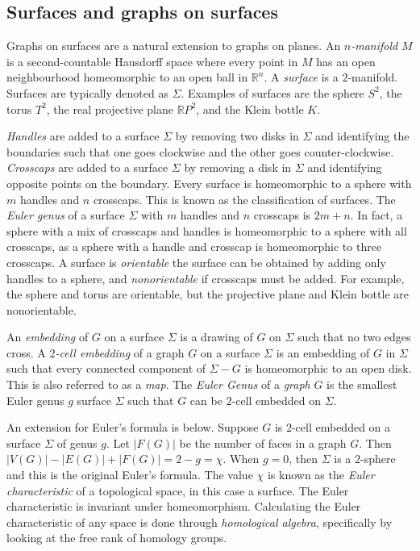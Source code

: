 \subsection{Surfaces and graphs on surfaces}
Graphs on surfaces are a natural extension to graphs on planes.
An \textit{$n$-manifold} $M$ is a second-countable Hausdorff space where every point in $M$ has an open neighbourhood homeomorphic to an open ball in $\mathbb{R}^n$.  
A \textit{surface} is a $2$-manifold. Surfaces are typically denoted as $\Sigma$. Examples of surfaces are the sphere $S^2$, the torus $T^2$, the real projective plane $\mathbb{R}P^2$, and the Klein bottle $K$. 

\textit{Handles} are added to a surface \(\Sigma\) by removing two disks in \(\Sigma\) and identifying the boundaries such that one goes clockwise and the other goes counter-clockwise. \textit{Crosscaps} are added to a surface $\Sigma$ by removing a disk in \(\Sigma\) and identifying opposite points on the boundary. Every surface is homeomorphic to a sphere with $m$ handles and $n$ crosscaps. This is known as the classification of surfaces. The \textit{Euler genus} of a surface \(\Sigma\) with $m$ handles and $n$ crosscaps is $2m + n$. In fact, a sphere with a mix of crosscaps and handles is homeomorphic to a sphere with all crosscaps, as a sphere with a handle and crosscap is homeomorphic to three crosscaps. A surface is \textit{orientable} the surface can be obtained by adding only handles to a sphere, and \textit{nonorientable} if crosscaps must be added. For example, the sphere and torus are orientable, but the projective plane and Klein bottle are nonorientable. 

An \textit{embedding} of $G$ on a surface $\Sigma$ is a drawing of $G$ on $\Sigma$ such that no two edges cross. 
A \textit{$2$-cell embedding} of a graph $G$ on a surface $\Sigma$ is an embedding of $G$ in $\Sigma$ such that every connected component of $\Sigma - G$ is homeomorphic to an open disk. This is also referred to as a \textit{map}. The \textit{Euler Genus} of a \textit{graph} \(G\) is the smallest Euler genus \(g\) surface \(\Sigma\) such that \(G\) can be $2$-cell embedded on $\Sigma$.

An extension for Euler's formula is below. Suppose $G$ is $2$-cell embedded on a surface $\Sigma$ of genus $g$. Let \(|F(G)|\) be the number of faces in a graph \(G\). Then \(|V(G)| - |E(G)| + |F(G)| = 2 - g = \chi\). When $g = 0$, then $\Sigma$ is a $2$-sphere and this is the original Euler's formula. 
The value $\chi$ is known as the \textit{Euler characteristic} of a topological space, in this case a surface. The Euler characteristic is invariant under homeomorphism. Calculating the Euler characteristic of any space is done through \textit{homological algebra}, specifically by looking at the free rank of homology groups. 

